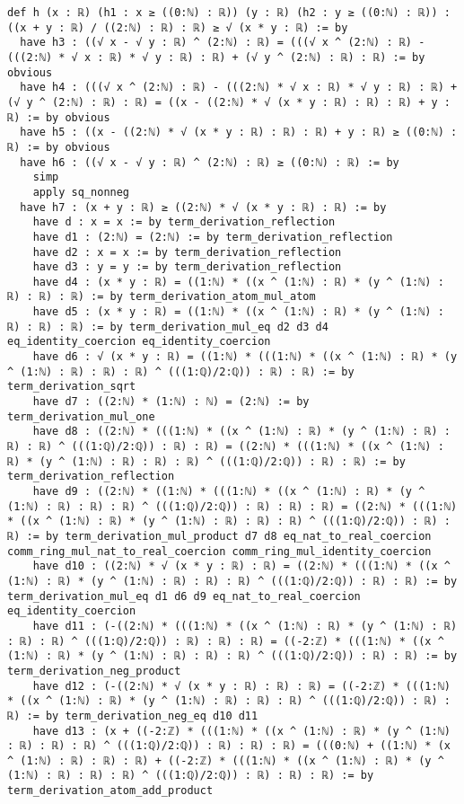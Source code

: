 \documentclass{article}
\begin{document}
\begin{tcolorbox}[colback=white!10, width=\linewidth]
\begin{lstlisting}[language=Lean4]
def h (x : ℝ) (h1 : x ≥ ((0:ℕ) : ℝ)) (y : ℝ) (h2 : y ≥ ((0:ℕ) : ℝ)) : ((x + y : ℝ) / ((2:ℕ) : ℝ) : ℝ) ≥ √ (x * y : ℝ) := by
  have h3 : ((√ x - √ y : ℝ) ^ (2:ℕ) : ℝ) = (((√ x ^ (2:ℕ) : ℝ) - (((2:ℕ) * √ x : ℝ) * √ y : ℝ) : ℝ) + (√ y ^ (2:ℕ) : ℝ) : ℝ) := by obvious
  have h4 : (((√ x ^ (2:ℕ) : ℝ) - (((2:ℕ) * √ x : ℝ) * √ y : ℝ) : ℝ) + (√ y ^ (2:ℕ) : ℝ) : ℝ) = ((x - ((2:ℕ) * √ (x * y : ℝ) : ℝ) : ℝ) + y : ℝ) := by obvious
  have h5 : ((x - ((2:ℕ) * √ (x * y : ℝ) : ℝ) : ℝ) + y : ℝ) ≥ ((0:ℕ) : ℝ) := by obvious
  have h6 : ((√ x - √ y : ℝ) ^ (2:ℕ) : ℝ) ≥ ((0:ℕ) : ℝ) := by
    simp
    apply sq_nonneg
  have h7 : (x + y : ℝ) ≥ ((2:ℕ) * √ (x * y : ℝ) : ℝ) := by
    have d : x = x := by term_derivation_reflection
    have d1 : (2:ℕ) = (2:ℕ) := by term_derivation_reflection
    have d2 : x = x := by term_derivation_reflection
    have d3 : y = y := by term_derivation_reflection
    have d4 : (x * y : ℝ) = ((1:ℕ) * ((x ^ (1:ℕ) : ℝ) * (y ^ (1:ℕ) : ℝ) : ℝ) : ℝ) := by term_derivation_atom_mul_atom
    have d5 : (x * y : ℝ) = ((1:ℕ) * ((x ^ (1:ℕ) : ℝ) * (y ^ (1:ℕ) : ℝ) : ℝ) : ℝ) := by term_derivation_mul_eq d2 d3 d4 eq_identity_coercion eq_identity_coercion
    have d6 : √ (x * y : ℝ) = ((1:ℕ) * (((1:ℕ) * ((x ^ (1:ℕ) : ℝ) * (y ^ (1:ℕ) : ℝ) : ℝ) : ℝ) ^ (((1:ℚ)/2:ℚ)) : ℝ) : ℝ) := by term_derivation_sqrt
    have d7 : ((2:ℕ) * (1:ℕ) : ℕ) = (2:ℕ) := by term_derivation_mul_one
    have d8 : ((2:ℕ) * (((1:ℕ) * ((x ^ (1:ℕ) : ℝ) * (y ^ (1:ℕ) : ℝ) : ℝ) : ℝ) ^ (((1:ℚ)/2:ℚ)) : ℝ) : ℝ) = ((2:ℕ) * (((1:ℕ) * ((x ^ (1:ℕ) : ℝ) * (y ^ (1:ℕ) : ℝ) : ℝ) : ℝ) ^ (((1:ℚ)/2:ℚ)) : ℝ) : ℝ) := by term_derivation_reflection
    have d9 : ((2:ℕ) * ((1:ℕ) * (((1:ℕ) * ((x ^ (1:ℕ) : ℝ) * (y ^ (1:ℕ) : ℝ) : ℝ) : ℝ) ^ (((1:ℚ)/2:ℚ)) : ℝ) : ℝ) : ℝ) = ((2:ℕ) * (((1:ℕ) * ((x ^ (1:ℕ) : ℝ) * (y ^ (1:ℕ) : ℝ) : ℝ) : ℝ) ^ (((1:ℚ)/2:ℚ)) : ℝ) : ℝ) := by term_derivation_mul_product d7 d8 eq_nat_to_real_coercion comm_ring_mul_nat_to_real_coercion comm_ring_mul_identity_coercion
    have d10 : ((2:ℕ) * √ (x * y : ℝ) : ℝ) = ((2:ℕ) * (((1:ℕ) * ((x ^ (1:ℕ) : ℝ) * (y ^ (1:ℕ) : ℝ) : ℝ) : ℝ) ^ (((1:ℚ)/2:ℚ)) : ℝ) : ℝ) := by term_derivation_mul_eq d1 d6 d9 eq_nat_to_real_coercion eq_identity_coercion
    have d11 : (-((2:ℕ) * (((1:ℕ) * ((x ^ (1:ℕ) : ℝ) * (y ^ (1:ℕ) : ℝ) : ℝ) : ℝ) ^ (((1:ℚ)/2:ℚ)) : ℝ) : ℝ) : ℝ) = ((-2:ℤ) * (((1:ℕ) * ((x ^ (1:ℕ) : ℝ) * (y ^ (1:ℕ) : ℝ) : ℝ) : ℝ) ^ (((1:ℚ)/2:ℚ)) : ℝ) : ℝ) := by term_derivation_neg_product
    have d12 : (-((2:ℕ) * √ (x * y : ℝ) : ℝ) : ℝ) = ((-2:ℤ) * (((1:ℕ) * ((x ^ (1:ℕ) : ℝ) * (y ^ (1:ℕ) : ℝ) : ℝ) : ℝ) ^ (((1:ℚ)/2:ℚ)) : ℝ) : ℝ) := by term_derivation_neg_eq d10 d11
    have d13 : (x + ((-2:ℤ) * (((1:ℕ) * ((x ^ (1:ℕ) : ℝ) * (y ^ (1:ℕ) : ℝ) : ℝ) : ℝ) ^ (((1:ℚ)/2:ℚ)) : ℝ) : ℝ) : ℝ) = (((0:ℕ) + ((1:ℕ) * (x ^ (1:ℕ) : ℝ) : ℝ) : ℝ) + ((-2:ℤ) * (((1:ℕ) * ((x ^ (1:ℕ) : ℝ) * (y ^ (1:ℕ) : ℝ) : ℝ) : ℝ) ^ (((1:ℚ)/2:ℚ)) : ℝ) : ℝ) : ℝ) := by term_derivation_atom_add_product

\end{lstlisting}
\end{tcolorbox}
\end{document}
